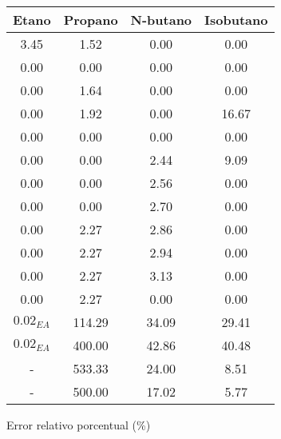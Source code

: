 \begin{figure}[H]
    \centering
    \caption{Error relativo porcentual (\%)}
    \small
    \begin{tabular}{|c|c|c|c|}
        \hline
        \textbf{Etano} & \textbf{Propano} & \textbf{N-butano} & \textbf{Isobutano} \\
        \hline
        3.45           & 1.52             & 0.00              & 0.00               \\
        \hline
        0.00           & 0.00             & 0.00              & 0.00               \\
        \hline
        0.00           & 1.64             & 0.00              & 0.00               \\
        \hline
        0.00           & 1.92             & 0.00              & 16.67              \\
        \hline
        0.00           & 0.00             & 0.00              & 0.00               \\
        \hline
        0.00           & 0.00             & 2.44              & 9.09               \\
        \hline
        0.00           & 0.00             & 2.56              & 0.00               \\
        \hline
        0.00           & 0.00             & 2.70              & 0.00               \\
        \hline
        0.00           & 2.27             & 2.86              & 0.00               \\
        \hline
        0.00           & 2.27             & 2.94              & 0.00               \\
        \hline
        0.00           & 2.27             & 3.13              & 0.00               \\
        \hline
        0.00           & 2.27             & 0.00              & 0.00               \\
        \hline
        $0.02_{EA}$    & 114.29           & 34.09             & 29.41              \\
        \hline
        $0.02_{EA}$    & 400.00           & 42.86             & 40.48              \\
        \hline
        -              & 533.33           & 24.00             & 8.51               \\
        \hline
        -              & 500.00           & 17.02             & 5.77               \\
        \hline

\end{tabular}
\end{figure}
